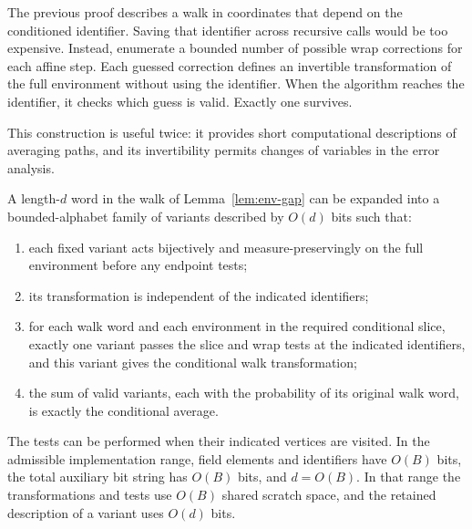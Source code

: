 The previous proof describes a walk in coordinates that depend on the conditioned identifier. Saving that identifier across recursive calls would be too expensive. Instead, enumerate a bounded number of possible wrap corrections for each affine step. Each guessed correction defines an invertible transformation of the full environment without using the identifier. When the algorithm reaches the identifier, it checks which guess is valid. Exactly one survives.

This construction is useful twice: it provides short computational descriptions of averaging paths, and its invertibility permits changes of variables in the error analysis.

\begin{lemma}\label{lem:env-variants}
A length-$d$ word in the walk of Lemma~\ref{lem:env-gap} can be expanded
into a bounded-alphabet family of variants described by $O(d)$ bits
such that:
\begin{enumerate}
\item each fixed variant acts bijectively and measure-preservingly on
the full environment before any endpoint tests;
\item its transformation is independent of the indicated identifiers;
\item for each walk word and each environment in the required
conditional slice, exactly one variant passes the slice and wrap
tests at the indicated identifiers, and this variant gives the
conditional walk transformation;
\item the sum of valid variants, each with the probability of its
original walk word, is exactly the conditional average.
\end{enumerate}
The tests can be performed when their indicated vertices are visited.
In the admissible implementation range, field elements and identifiers
have $O(B)$ bits, the total auxiliary bit string has $O(B)$ bits, and $d=O(B)$.
In that range the transformations and tests use $O(B)$ shared scratch space, and
the retained description of a variant uses $O(d)$ bits.
\end{lemma}

